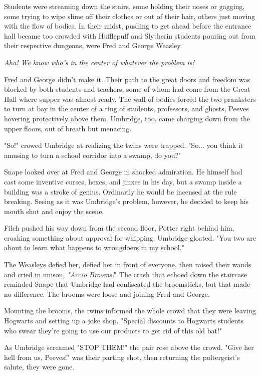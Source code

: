 \documentclass[a4paper,11pt]{article}
\begin{document}
Students were streaming down the stairs, some holding their noses or gagging, some trying to wipe slime off their clothes or out of their hair, others just moving with the flow of bodies. In their midst, pushing to get ahead before the entrance hall became too crowded with Hufflepuff and Slytherin students pouring out from their respective dungeons, were Fred and George Weasley.

\emph{Aha! We know who's in the center of whatever the problem is!}

Fred and George didn't make it. Their path to the great doors and freedom was blocked by both students and teachers, some of whom had come from the Great Hall where supper was almost ready. The wall of bodies forced the two pranksters to turn at bay in the center of a ring of students, professors, and ghosts, Peeves hovering protectively above them. Umbridge, too, came charging down from the upper floors, out of breath but menacing.

"So!" crowed Umbridge at realizing the twins were trapped. "So... you think it amusing to turn a school corridor into a swamp, do you?"

Snape looked over at Fred and George in shocked admiration. He himself had cast some inventive curses, hexes, and jinxes in his day, but a swamp inside a building was a stroke of genius. Ordinarily he would be incensed at the rule breaking. Seeing as it was Umbridge's problem, however, he decided to keep his mouth shut and enjoy the scene.

Filch pushed his way down from the second floor, Potter right behind him, croaking something about approval for whipping. Umbridge gloated. "You two are about to learn what happens to wrongdoers in my school."

The Weasleys defied her, defied her in front of everyone, then raised their wands and cried in unison, \emph{"Accio Brooms!}" The crash that echoed down the staircase reminded Snape that Umbridge had confiscated the broomsticks, but that made no difference. The brooms were loose and joining Fred and George.

Mounting the brooms, the twins informed the whole crowd that they were leaving Hogwarts and setting up a joke shop. "Special discounts to Hogwarts students who swear they're going to use our products to get rid of this old bat!"

As Umbridge screamed "STOP THEM!" the pair rose above the crowd. "Give her hell from us, Peeves!" was their parting shot, then returning the poltergeist's salute, they were gone.
\end{document}
